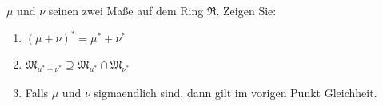 
\begin{exercise}

$\mu$ und $\nu$ seinen zwei Maße auf dem Ring $\mathfrak{R}$. Zeigen Sie:

\begin{enumerate}[label = (\alph*)]

  \item
  $(\mu + \nu)^\ast = \mu^\ast + \nu^\ast$
  
  \item
  $\mathfrak{M}_{\mu^\ast + \nu^\ast} \supseteq \mathfrak{M}_{\mu^\ast} \cap \mathfrak{M}_{\nu^\ast}$
  
  \item
  Falls $\mu$ und $\nu$ sigmaendlich sind, dann gilt im vorigen Punkt Gleichheit.

\end{enumerate}

\end{exercise}


